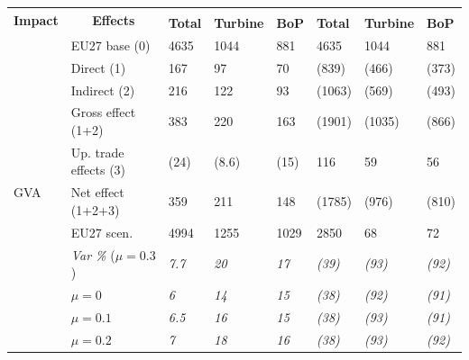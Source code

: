\begin{table}[!t]
\centering
\footnotesize
\renewcommand{\arraystretch}{1.08}
\setlength{\tabcolsep}{4pt}

\begin{tabular}{ll|>{\raggedleft\arraybackslash}p{1.30cm}>{\raggedleft\arraybackslash}p{1.30cm}>{\raggedleft\arraybackslash}p{1.30cm}|>{\raggedleft\arraybackslash}p{1.30cm}>{\raggedleft\arraybackslash}p{1.30cm}>{\raggedleft\arraybackslash}p{1.30cm}}
\toprule
\multicolumn{1}{c}{\multirow{2}{*}{\textbf{Impact}}} & \multicolumn{1}{c|}{\multirow{2}{*}{\textbf{Effects}}} & \multicolumn{3}{c|}{\textbf{Resilience ($\delta=100$)}} & \multicolumn{3}{c}{\textbf{Offshoring ($\delta=-100$)}} \\
& & \textbf{Total} & \textbf{Turbine} & \textbf{BoP} & \textbf{Total} & \textbf{Turbine} & \textbf{BoP} \\
\midrule
\multirow{14}{*}{GVA}& EU27 base (0)& \num{4635}& \num{1044}& \num{881}& \num{4635}& \num{1044}& \num{881} \\
\cline{2-8}
& Direct (1)& \num{167}& \num{97}& \num{70}& (\num{839})& (\num{466})& (\num{373}) \\
& Indirect (2)& \num{216}& \num{122}& \num{93}& (\num{1063})& (\num{569})& (\num{493}) \\
& Gross effect (1+2)& \num{383}& \num{220}& \num{163}& (\num{1901})& (\num{1035})& (\num{866}) \\
& Up. trade effects (3)& (\num{24})& (\num{8.6})& (\num{15})& \num{116}& \num{59}& \num{56} \\
& Net effect (1+2+3)& \num{359}& \num{211}& \num{148}& (\num{1785})& (\num{976})& (\num{810}) \\
\cline{2-8}
& EU27 scen.& \num{4994}& \num{1255}& \num{1029}& \num{2850}& \num{68}& \num{72} \\
\cline{2-8}
& \textit{Var \%} ($\mu=0.3$)& \textit{\num{7.7}}& \textit{\num{20}}& \textit{\num{17}}& \textit{(\num{39})}& \textit{(\num{93})}& \textit{(\num{92})} \\
\arrayrulecolor{gray}\cline{2-8}\arrayrulecolor{black}
& $\mu=0$& \textit{\num{6}}& \textit{\num{14}}& \textit{\num{15}}& \textit{(\num{38})}& \textit{(\num{92})}& \textit{(\num{91})} \\
& $\mu=0.1$& \textit{\num{6.5}}& \textit{\num{16}}& \textit{\num{15}}& \textit{(\num{38})}& \textit{(\num{93})}& \textit{(\num{91})} \\
& $\mu=0.2$& \textit{\num{7}}& \textit{\num{18}}& \textit{\num{16}}& \textit{(\num{38})}& \textit{(\num{93})}& \textit{(\num{92})} \\

\end{tabular}
\end{table}
